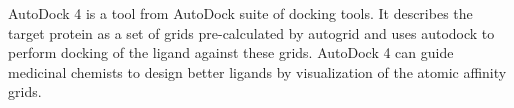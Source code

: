 AutoDock 4 is a tool from AutoDock suite of docking tools. It describes the target protein as a set of grids pre-calculated by autogrid and uses autodock to perform docking of the ligand against these grids. AutoDock 4 can guide medicinal chemists to design better ligands by visualization of the atomic affinity grids. 